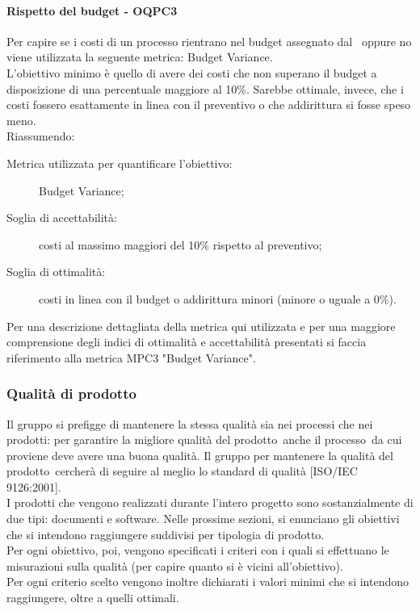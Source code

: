 \documentclass[../PianoDiQualifica.tex]{subfiles}
\begin{document}
		\paragraph{Rispetto del budget - OQPC3}
		Per capire se i costi di un processo rientrano nel budget assegnato dal \pianodiprogetto\ oppure no viene utilizzata la seguente metrica: Budget Variance.\\
		L’obiettivo minimo è quello di avere dei costi che non superano il budget a disposizione di una percentuale maggiore al 10\%. Sarebbe ottimale, invece, che i costi fossero esattamente in linea con il preventivo o che addirittura si fosse speso meno.\\
		Riassumendo:
		\begin{description}
			\item[Metrica utilizzata per quantificare l’obiettivo:] Budget Variance;
			\item[Soglia di accettabilità:] costi al massimo maggiori del 10\% rispetto al preventivo;
			\item[Soglia di ottimalità:] costi in linea con il budget o addirittura minori (minore o uguale a 0\%).
		\end{description}
		Per una descrizione dettagliata della metrica qui utilizzata e per una maggiore comprensione degli indici di ottimalità e accettabilità presentati si faccia riferimento alla metrica MPC3 "Budget Variance".
		
		\subsubsection{Qualità di prodotto}
		Il gruppo si prefigge di mantenere la stessa qualità sia nei processi che nei prodotti: per garantire la migliore qualità del prodotto\g\ anche il processo\g\ da cui proviene deve avere una buona qualità. Il gruppo per mantenere la qualità del prodotto\g\ cercherà di seguire al meglio lo standard di qualità [ISO/IEC 9126:2001].\\
		I prodotti che vengono realizzati durante l'intero progetto sono sostanzialmente di due tipi: documenti e software\g. Nelle prossime sezioni, si enunciano gli obiettivi che si intendono raggiungere suddivisi per tipologia di prodotto\g.\\
		Per ogni obiettivo, poi, vengono specificati i criteri con i quali si effettuano le misurazioni sulla qualità (per capire quanto si è vicini all’obiettivo).\\
		Per ogni criterio scelto vengono inoltre dichiarati i valori minimi che si intendono raggiungere, oltre a quelli ottimali.\\
				
\end{document}
